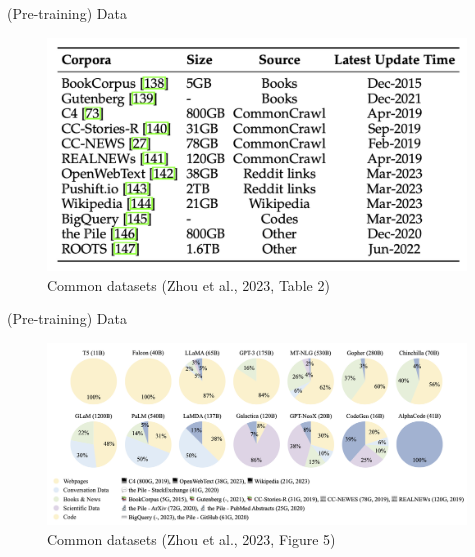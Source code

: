 \documentclass[10pt]{beamer}
\begin{document}
\begin{frame}{(Pre-training) Data}

\begin{figure}[h]
\centering
\includegraphics[width=0.99\textwidth]{fig/zhou_2023_tab2}
\caption{Common datasets (Zhou et al., 2023, Table 2)}
\end{figure}


\end{frame}

\begin{frame}{(Pre-training) Data}

\begin{figure}[h]
\centering
\includegraphics[width=0.99\textwidth]{fig/zhou_2023_fig5}
\caption{Common datasets (Zhou et al., 2023, Figure 5)}
\end{figure}


\end{frame}
\end{document}
